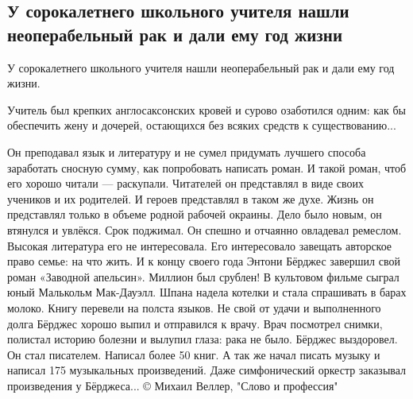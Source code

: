  
 
 
 
 

\subsection{У сорокалетнего школьного учителя нашли неоперабельный рак и дали ему год жизни}
\label{sec:17_05_2021.fb.krjukova_svetlana.1.pisatel_bolezn_rak}

У сорокалетнего школьного учителя нашли неоперабельный рак и дали ему год жизни. 

Учитель был крепких англосаксонских кровей и сурово озаботился одним: как бы
обеспечить жену и дочерей, остающихся без всяких средств к существованию...

Он преподавал язык и литературу и не сумел придумать лучшего способа заработать сносную сумму, как попробовать написать роман. 
И такой роман, чтоб его хорошо читали — раскупали. Читателей он представлял в виде своих учеников и их родителей. 
И героев представлял в таком же духе. Жизнь он представлял только в объеме родной рабочей окраины.
Дело было новым, он втянулся и увлёкся. Срок поджимал. Он спешно и отчаянно овладевал ремеслом. Высокая литература его не интересовала. Его интересовало завещать авторское право семье: на что жить.
И к концу своего года Энтони Бёрджес завершил свой роман «Заводной апельсин». 
Миллион был срублен! 
В культовом фильме сыграл юный Малькольм Мак-Дауэлл. Шпана надела котелки и стала спрашивать в барах молоко. Книгу перевели на полста языков.
Не свой от удачи и выполненного долга Бёрджес хорошо выпил и отправился к врачу. 
Врач посмотрел снимки, полистал историю болезни и вылупил глаза: рака не было. 
Бёрджес выздоровел.
Он стал писателем. 
Написал более 50 книг. 
А так же начал писать музыку и написал 175 музыкальных произведений. Даже симфонический оркестр заказывал произведения у Бёрджеса...
©️ Михаил Веллер, "Слово и профессия"
